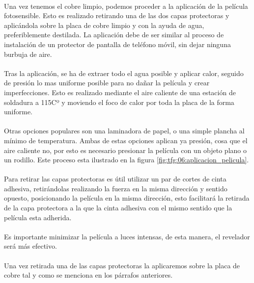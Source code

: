 \paragraph{} Una vez tenemos el cobre limpio, podemos proceder a la aplicación de la película fotosensible. Esto es realizado retirando una de las dos capas protectoras y aplicándola sobre la placa de cobre limpio y con la ayuda de agua, preferiblemente destilada. La aplicación debe de ser similar al proceso de instalación de un protector de pantalla de teléfono móvil, sin dejar ninguna burbuja de aire.

\paragraph{} Tras la aplicación, se ha de extraer todo el agua posible y aplicar calor, seguido de presión lo mas uniforme posible para no dañar la película y crear imperfecciones. Esto es realizado mediante el aire caliente de una estación de soldadura a 115Cº y moviendo el foco de calor por toda la placa de la forma uniforme. 

\paragraph{} Otras opciones populares son una laminadora de papel, o una simple plancha al mínimo de temperatura. Ambas de estas opciones aplican ya presión, cosa que el aire caliente no, por esto es necesario presionar la película con un objeto plano o un rodillo. Este proceso esta ilustrado en la figura \ref{fig:tfg:06:aplicacion_pelicula}.

\paragraph{} Para retirar las capas protectoras es útil utilizar un par de cortes de cinta adhesiva, retirándolas realizando la fuerza en la misma dirección y sentido opuesto, posicionando la película en la misma dirección, esto facilitará la retirada de la capa protectora a la que la cinta adhesiva con el mismo sentido que la película esta adherida.

\paragraph{} Es importante minimizar la película a luces intensas, de esta manera, el revelador será más efectivo.

\paragraph{} Una vez retirada una de las capas protectoras la aplicaremos sobre la placa de cobre tal y como se menciona en los párrafos anteriores.

